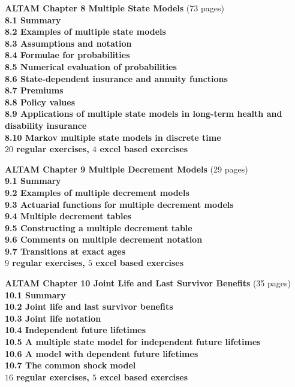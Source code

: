 \documentclass[hidelinks, 12pt]{article}
\theoremstyle{mydefstyle}
\theoremstyle{mythmstyle}
\begin{document}
\textbf{ALTAM Chapter 8 Multiple State Models} (73 pages) \\
\textbf{8.1 Summary} \\
\textbf{8.2 Examples of multiple state models} \\
\textbf{8.3 Assumptions and notation} \\
\textbf{8.4 Formulae for probabilities} \\
\textbf{8.5 Numerical evaluation of probabilities} \\
\textbf{8.6 State-dependent insurance and annuity functions} \\
\textbf{8.7 Premiums} \\
\textbf{8.8 Policy values} \\
\textbf{8.9 Applications of multiple state models in long-term health and disability insurance} \\
\textbf{8.10 Markov multiple state models in discrete time} \\
\textbf{$20$ regular exercises, $4$ excel based exercises}

\textbf{ALTAM Chapter 9 Multiple Decrement Models} (29 pages) \\
\textbf{9.1 Summary} \\
\textbf{9.2 Examples of multiple decrement models} \\
\textbf{9.3 Actuarial functions for multiple decrement models} \\
\textbf{9.4 Multiple decrement tables} \\
\textbf{9.5 Constructing a multiple decrement table} \\
\textbf{9.6 Comments on multiple decrement notation} \\
\textbf{9.7 Transitions at exact ages} \\
\textbf{$9$ regular exercises, $5$ excel based exercises}

\textbf{ALTAM Chapter 10 Joint Life and Last Survivor Benefits} (35 pages) \\
\textbf{10.1 Summary} \\
\textbf{10.2 Joint life and last survivor benefits} \\
\textbf{10.3 Joint life notation} \\
\textbf{10.4 Independent future lifetimes} \\
\textbf{10.5 A multiple state model for independent future lifetimes} \\
\textbf{10.6 A model with dependent future lifetimes} \\
\textbf{10.7 The common shock model} \\
\textbf{$16$ regular exercises, $5$ excel based exercises}
\end{document}
